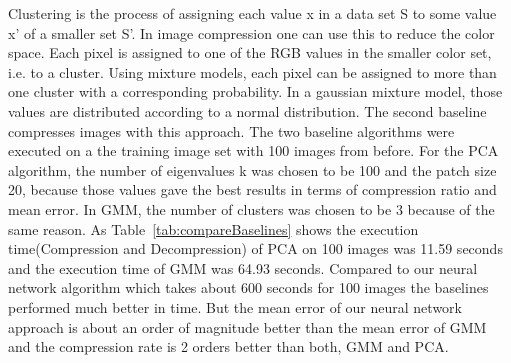 \newline
Clustering is the process of assigning each value x in a data set S to some value x' of a smaller set S'. In image compression one can use this to reduce the color space. Each pixel is assigned to one of the RGB values in the smaller color set, i.e. to a cluster. Using mixture models, each pixel can be assigned to more than one cluster with a corresponding probability. In a gaussian mixture model, those values are distributed according to a normal distribution. The second baseline compresses images with this approach. 
\newline
The two baseline algorithms were executed on a the training image set with 100 images from before. For the PCA algorithm, the number of eigenvalues k was chosen to be 100 and the patch size 20, because those values gave the best results in terms of compression ratio and mean error. In GMM, the number of clusters was chosen to be 3 because of the same reason. As Table~\ref{tab:compareBaselines} shows the execution time(Compression and Decompression) of PCA on 100 images was 11.59 seconds and the execution time of GMM was 64.93 seconds. Compared to our neural network algorithm which takes about 600 seconds for 100 images the baselines performed much better in time. But the mean error of our neural network approach is about an order of magnitude better than the mean error of GMM and the compression rate is 2 orders better than both, GMM and PCA.





